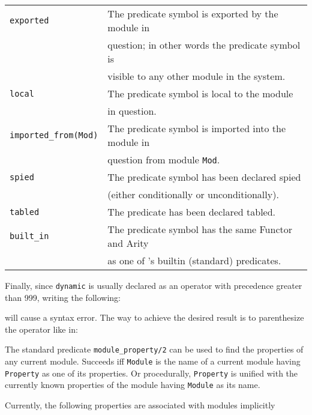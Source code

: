 \begin{description}
\begin{center}
\begin{tabular}{||l|l||}
	\hline
	{\tt exported}	&
		The predicate symbol is exported by the module in \\ 
	&	question; in other words the predicate symbol is \\
	&	visible to any other module in the system. \\ \hline
	{\tt local}	& 
		The predicate symbol is local to the module \\
	&	in question. \\ \hline
	{\tt imported\_from(Mod)}	& 
		The predicate symbol is imported into the module in \\
	&	question from module {\tt Mod}. \\ \hline
	\hline
	{\tt spied}		&
		The predicate symbol has been declared spied \\
	&	(either conditionally or unconditionally). \\ \hline
	\hline
	{\tt tabled}	& 
		The predicate has been declared tabled. \\ \hline
	\hline
	{\tt built\_in}	& 
		The predicate symbol has the same Functor and Arity \\
	&	as one of \ourprolog's builtin (standard) predicates. \\ \hline
    \end{tabular}
    \end{center}

    Finally, since {\tt dynamic} is usually declared as an operator with 
    precedence greater than 999, writing the following:


    will cause a syntax error. The way to achieve the desired result is to
    parenthesize the operator like in:



    The standard predicate {\tt module\_property/2} can be used to find the
    properties of any current module.
    Succeeds iff {\tt Module} is the name of a current module having 
    {\tt Property} as one of its properties. Or procedurally, {\tt Property}
    is unified with the currently known properties of the module having 
    {\tt Module} as its name.

    Currently, the following properties are associated with modules 
    implicitly 


\end{description}
